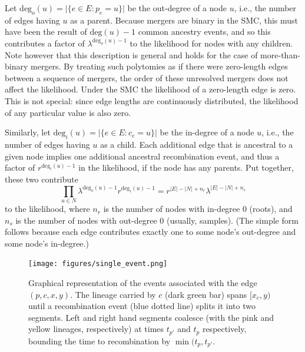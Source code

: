 \documentclass{article}
\renewcommand{\deg}{\mathrm{deg}}
\begin{document}
Let $\deg_o(u) = \vert\{e \in E : p_e=u\}\vert$ be the out-degree of a node $u$,
i.e., the number of edges having $u$ as a parent.
Because mergers are binary in the SMC,
this must have been the result of $\deg(u) - 1$ common ancestry events,
and so this contributes a factor of $\lambda^{\deg_o(u)-1}$ to the likelihood
for nodes with any children.
Note however that this description is general and holds for the case of
more-than-binary mergers. By treating such polytomies as if there were zero-length edges
between a sequence of mergers, the order of these unresolved mergers does 
not affect the likelihood. Under the SMC the likelihood of a zero-length edge is zero.
This is not special: since edge lengths are continuously distributed,
the likelihood of any particular value is also zero.

Similarly,
let $\deg_i(u) = \vert\{e \in E : c_e=u\}\vert$ be the in-degree of a node $u$,
i.e., the number of edges having $u$ as a child.
Each additional edge that is ancestral to a given node
implies one additional ancestral recombination event,
and thus a factor of  $r^{\deg_i(u)-1}$ in the likelihood,
if the node has any parents.
Put together, these two contribute
\begin{equation}\label{eq:coal}
    \prod_{u \in N} \lambda^{\deg_o(u)-1} r^{\deg_i(u)-1}  
    =
    r^{|E|-|N|+n_r} 
    \lambda^{|E|-|N|+n_s} 
\end{equation}
to the likelihood,
where $n_r$ is the number of nodes with in-degree 0 (roots),
and $n_s$ is the number of nodes with out-degree 0 (usually, samples).
(The simple form follows because each edge contributes exactly one
to some node's out-degree and some node's in-degree.)


\begin{figure}
    \centering
    \texttt{[image: figures/single\_event.png]}
    \caption{
    Graphical representation of the events associated with the edge $(p,c,x,y)$.
    The lineage carried by $c$ (dark green bar) spans $[x_c,y)$ 
    until a recombination event (blue
    dotted line) splits it into two segments. Left and right hand segments coalesce
    (with the pink and yellow lineages, respectively)
    at times $t_{p'}$ and $t_p$ respectively, bounding the time to recombination by
    $\min(t_p, t_{p'}$.
    \label{fig:likelihood}
    }
\end{figure}
\end{document}
